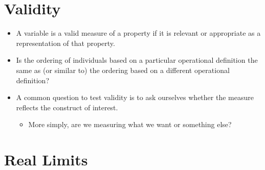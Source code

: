 \documentclass[12pt]{article}
\begin{document}
\section{Validity}\label{validity}

\begin{itemize}
\itemsep1pt\parskip0pt
\item
  A variable is a valid measure of a property if it is relevant or
  appropriate as a representation of that property.
\item
  Is the ordering of individuals based on a particular operational
  definition the same as (or similar to) the ordering based on a
  different operational definition?
\item
  A common question to test validity is to ask ourselves whether the
  measure reflects the construct of interest.

  \begin{itemize}
  \itemsep1pt\parskip0pt
  \item
    More simply, are we measuring what we want or something else?
  \end{itemize}
\end{itemize}

\section{Real Limits}\label{real-limits}
\end{document}
